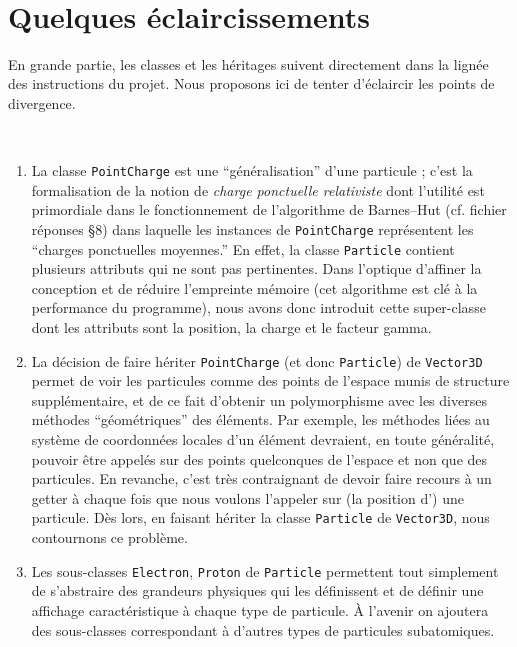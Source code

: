 \documentclass[12pt, letterpaper, twoside]{article}
\newcommand{\T}[1]{\texttt{#1}}
\begin{document}
\ \linebreak
\ \linebreak
\section{Quelques éclaircissements}
\noindent En grande partie, les classes et les héritages suivent directement dans la lignée des instructions du projet. Nous proposons ici de tenter d'éclaircir les points de divergence.

\ \linebreak
\begin{enumerate}
	\item La classe \T{PointCharge} est une ``généralisation'' d'une particule ; c'est la formalisation de la notion de \textit{charge ponctuelle relativiste} dont l'utilité est primordiale dans le fonctionnement de l'algorithme de Barnes--Hut (cf. fichier réponses \S 8) dans laquelle les instances de \T{PointCharge} représentent les ``charges ponctuelles moyennes.'' En effet, la classe \T{Particle} contient plusieurs attributs qui ne sont pas pertinentes. Dans l'optique d'affiner la conception et de réduire l'empreinte mémoire (cet algorithme est clé à la performance du programme), nous avons donc introduit cette super-classe dont les attributs sont la position, la charge et le facteur gamma.

	\item La décision de faire hériter \T{PointCharge} (et donc \T{Particle}) de \T{Vector3D} permet de voir les particules comme des points de l'espace munis de structure supplémentaire, et de ce fait d'obtenir un polymorphisme avec les diverses méthodes ``géométriques'' des éléments. Par exemple, les méthodes liées au système de coordonnées locales d'un élément devraient, en toute généralité, pouvoir être appelés sur des points quelconques de l'espace et non que des particules. En revanche, c'est très contraignant de devoir faire recours à un getter à chaque fois que nous voulons l'appeler sur (la position d') une particule. Dès lors, en faisant hériter la classe \T{Particle} de \T{Vector3D}, nous contournons ce problème.

	\item Les sous-classes \T{Electron}, \T{Proton} de \T{Particle} permettent tout simplement de s'abstraire des grandeurs physiques qui les définissent et de définir une affichage caractéristique à chaque type de particule. À l'avenir on ajoutera des sous-classes correspondant à d'autres types de particules subatomiques.


\end{enumerate}
\end{document}
